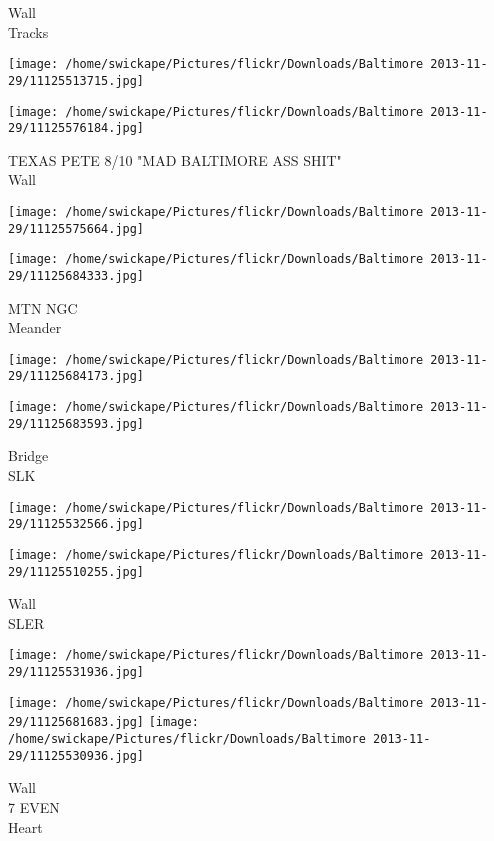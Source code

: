 \documentclass[10pt,letterpaper]{article}
\begin{document}
Wall\\
Tracks
\pagebreak

\texttt{[image: /home/swickape/Pictures/flickr/Downloads/Baltimore 2013-11-29/11125513715.jpg]}

\vspace{0.25in}
\texttt{[image: /home/swickape/Pictures/flickr/Downloads/Baltimore 2013-11-29/11125576184.jpg]}

TEXAS PETE 8/10 "MAD BALTIMORE ASS SHIT"\\
Wall
\pagebreak

\texttt{[image: /home/swickape/Pictures/flickr/Downloads/Baltimore 2013-11-29/11125575664.jpg]}

\vspace{0.25in}
\texttt{[image: /home/swickape/Pictures/flickr/Downloads/Baltimore 2013-11-29/11125684333.jpg]}

MTN NGC\\
Meander
\pagebreak

\texttt{[image: /home/swickape/Pictures/flickr/Downloads/Baltimore 2013-11-29/11125684173.jpg]}

\vspace{0.25in}
\texttt{[image: /home/swickape/Pictures/flickr/Downloads/Baltimore 2013-11-29/11125683593.jpg]}

Bridge\\
SLK
\pagebreak

\texttt{[image: /home/swickape/Pictures/flickr/Downloads/Baltimore 2013-11-29/11125532566.jpg]}

\vspace{0.25in}
\texttt{[image: /home/swickape/Pictures/flickr/Downloads/Baltimore 2013-11-29/11125510255.jpg]}

Wall\\
SLER
\pagebreak

\texttt{[image: /home/swickape/Pictures/flickr/Downloads/Baltimore 2013-11-29/11125531936.jpg]}

\vspace{0.25in}
\texttt{[image: /home/swickape/Pictures/flickr/Downloads/Baltimore 2013-11-29/11125681683.jpg]}
\texttt{[image: /home/swickape/Pictures/flickr/Downloads/Baltimore 2013-11-29/11125530936.jpg]}

Wall\\
7 EVEN\\
Heart
\pagebreak
\end{document}
